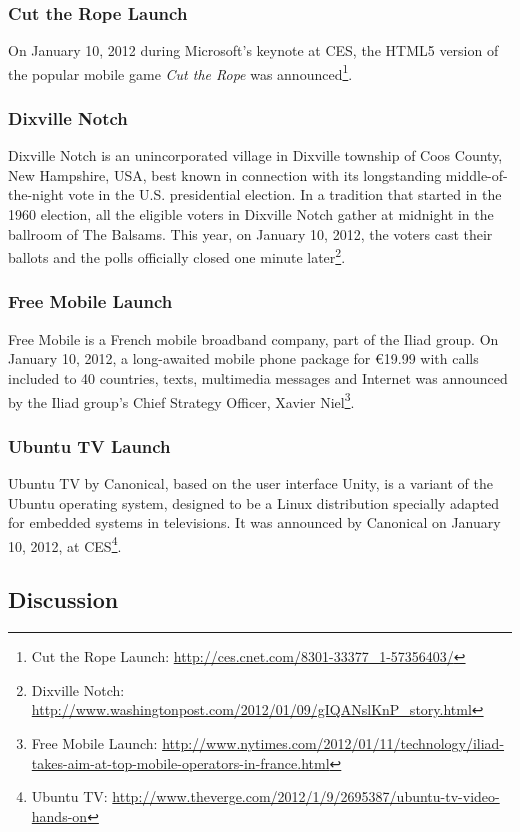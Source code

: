 \documentclass{acm_proc_article-sp}
\newcommand{\inlinelistingsize}{\fontsize{8pt}{11pt}}
\let\oldurl\url
\renewcommand{\url}[1]{\inlinelistingsize\oldurl{#1}}
\begin{document}
\subsubsection{Cut the Rope Launch}
On January 10, 2012 during Microsoft's keynote at CES, the HTML5 version of the popular mobile game \textit{Cut the Rope} was announced\footnote{Cut the Rope Launch: \url{http://ces.cnet.com/8301-33377_1-57356403/}}.

\subsubsection{Dixville Notch}
Dixville Notch is an unincorporated village in Dixville township of Coos County, New Hampshire, USA, best known in connection with its longstanding middle-of-the-night vote in the U.S. presidential election.
In a tradition that started in the 1960 election, all the eligible voters in Dixville Notch gather at midnight in the ballroom of The Balsams.
This year, on January 10, 2012, the voters cast their ballots and the polls officially closed one minute later\footnote{Dixville Notch: \url{http://www.washingtonpost.com/2012/01/09/gIQANslKnP_story.html}}.

\subsubsection{Free Mobile Launch}
Free Mobile is a French mobile broadband company, part of the Iliad group.
On January 10, 2012, a long-awaited mobile phone package for €19.99 with calls included to 40 countries, texts, multimedia messages and Internet was announced by the Iliad group's Chief Strategy Officer, Xavier Niel\footnote{Free Mobile Launch: \url{http://www.nytimes.com/2012/01/11/technology/iliad-takes-aim-at-top-mobile-operators-in-france.html}}.

\subsubsection{Ubuntu TV Launch}
Ubuntu TV by Canonical, based on the user interface Unity, is a variant of the Ubuntu operating system, designed to be a Linux distribution specially adapted for embedded systems in televisions. It was announced by Canonical on January 10, 2012, at CES\footnote{Ubuntu TV: \url{http://www.theverge.com/2012/1/9/2695387/ubuntu-tv-video-hands-on}}.

\subsection{Discussion}
\end{document}
